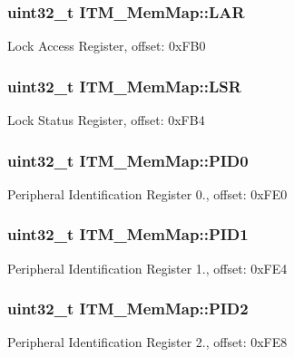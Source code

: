 \subsubsection[{L\+A\+R}]{\setlength{\rightskip}{0pt plus 5cm}uint32\+\_\+t I\+T\+M\+\_\+\+Mem\+Map\+::\+L\+A\+R}\label{struct_i_t_m___mem_map_af3f0dfff8c586620bdb0026aca56fe05}
Lock Access Register, offset\+: 0x\+F\+B0 \hypertarget{struct_i_t_m___mem_map_a8ecbf568728eeaac07edd3774a4dbd9f}{}
\subsubsection[{L\+S\+R}]{\setlength{\rightskip}{0pt plus 5cm}uint32\+\_\+t I\+T\+M\+\_\+\+Mem\+Map\+::\+L\+S\+R}\label{struct_i_t_m___mem_map_a8ecbf568728eeaac07edd3774a4dbd9f}
Lock Status Register, offset\+: 0x\+F\+B4 \hypertarget{struct_i_t_m___mem_map_a33d99fb4c1d69a6ca62e0e3442f07a95}{}
\subsubsection[{P\+I\+D0}]{\setlength{\rightskip}{0pt plus 5cm}uint32\+\_\+t I\+T\+M\+\_\+\+Mem\+Map\+::\+P\+I\+D0}\label{struct_i_t_m___mem_map_a33d99fb4c1d69a6ca62e0e3442f07a95}
Peripheral Identification Register 0., offset\+: 0x\+F\+E0 \hypertarget{struct_i_t_m___mem_map_a7de8ee5b7f467a00ac6c7290c93b39a8}{}
\subsubsection[{P\+I\+D1}]{\setlength{\rightskip}{0pt plus 5cm}uint32\+\_\+t I\+T\+M\+\_\+\+Mem\+Map\+::\+P\+I\+D1}\label{struct_i_t_m___mem_map_a7de8ee5b7f467a00ac6c7290c93b39a8}
Peripheral Identification Register 1., offset\+: 0x\+F\+E4 \hypertarget{struct_i_t_m___mem_map_a3741dc3de5146a9df958acae0b2e0ea0}{}
\subsubsection[{P\+I\+D2}]{\setlength{\rightskip}{0pt plus 5cm}uint32\+\_\+t I\+T\+M\+\_\+\+Mem\+Map\+::\+P\+I\+D2}\label{struct_i_t_m___mem_map_a3741dc3de5146a9df958acae0b2e0ea0}
Peripheral Identification Register 2., offset\+: 0x\+F\+E8 \hypertarget{struct_i_t_m___mem_map_a224feb863e1cd18dcb71e8da810f9d61}{}
